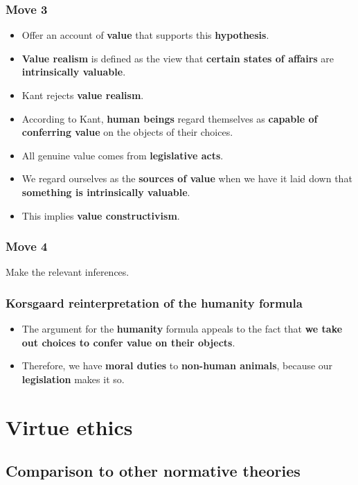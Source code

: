 \documentclass[11pt]{article}
\begin{document}
 \newpage
\subsubsection{Move 3}
\label{sec:orga06e5fb}
\begin{itemize}
\item Offer an account of \textbf{value} that supports this \textbf{hypothesis}.
\item \textbf{Value realism} is defined as the view that \textbf{certain states of affairs} are \textbf{intrinsically valuable}.
\item Kant rejects \textbf{value realism}.
\item According to Kant, \textbf{human beings} regard themselves as \textbf{capable of conferring value} on the objects of their choices.
\item All genuine value comes from \textbf{legislative acts}.
\item We regard ourselves as the \textbf{sources of value} when we have it laid down that \textbf{something is intrinsically valuable}.
\item This implies \textbf{value constructivism}.
\end{itemize}
\subsubsection{Move 4}
\label{sec:org2b8a510}
Make the relevant inferences.
\subsubsection{Korsgaard reinterpretation of the humanity formula}
\label{sec:orgcd3653f}
\begin{itemize}
\item The argument for the \textbf{humanity} formula appeals to the fact that \textbf{we take out choices to confer value on their objects}.
\item Therefore, we have \textbf{moral duties} to \textbf{non-human animals}, because our \textbf{legislation} makes it so.
\end{itemize}

 \newpage
\section{Virtue ethics}
\label{sec:org80feeaf}

\subsection{Comparison to other normative theories}
\label{sec:org58636a2}
\end{document}
